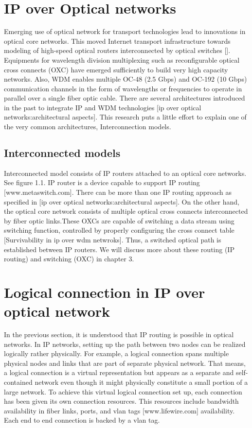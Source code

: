\section{IP over Optical networks}

Emerging use of optical network for transport technologies lead to innovations in optical core networks. This moved Internet transport infrastructure towards modeling of high-speed optical routers interconnected by optical switches []. Equipments for wavelength division multiplexing such as reconfigurable optical cross connects (OXC) have emerged sufficiently to build very high capacity networks. Also, WDM enables multiple OC-48 (2.5 Gbps) and OC-192 (10 Gbps) communication channels in the form of wavelengths or frequencies to operate in parallel over a single fiber optic cable. There are several architectures introduced in the past to integrate IP and WDM technologies [ip over optical networks:architectural aspects]. This research puts a little effort to explain one of the very common architectures, Interconnection models. 

\subsection{Interconnected models}
Interconnected model consists of IP routers attached to an optical core networks. See figure 1.1. IP router is a device capable to support IP routing [www.metaswitch.com]. There can be more than one IP routing approach as specified in [ip over optical networks:architectural aspects]. On the other hand, the optical core network consists of multiple optical cross connects interconnected by fiber optic links.These OXCs are capable of switching a data stream using switching function, controlled by properly configuring the cross connect table [Survivability in ip over wdm netwroks]. Thus, a switched optical path is established between IP routers. We will discuss more about these routing (IP routing) and switching (OXC) in chapter 3.

\section{Logical connection in IP over optical network}
In the previous section, it is understood that IP routing is possible in optical networks. In IP networks, setting up the path between two nodes can be realized logically rather physically. For example, a logical connection spans multiple physical nodes and links that are part of separate physical network. That means, a logical connection is a virtual representation but appears as a separate and self-contained network even though it might physically constitute a small portion of a large network. To achieve this virtual logical connection set up, each connection has been given its own connection resources. This resources include bandwidth availability in fiber links, ports, and vlan tags [www.lifewire.com] availability. Each end to end connection is backed by a vlan tag.

